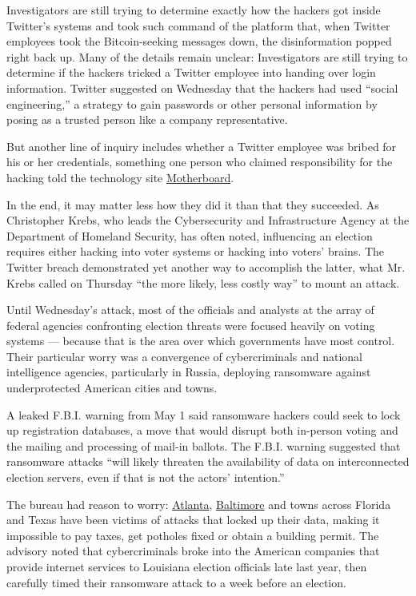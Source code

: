 Investigators are still trying to determine exactly how the hackers got
inside Twitter's systems and took such command of the platform that,
when Twitter employees took the Bitcoin-seeking messages down, the
disinformation popped right back up. Many of the details remain unclear:
Investigators are still trying to determine if the hackers tricked a
Twitter employee into handing over login information. Twitter suggested
on Wednesday that the hackers had used ``social engineering,'' a
strategy to gain passwords or other personal information by posing as a
trusted person like a company representative.

But another line of inquiry includes whether a Twitter employee was
bribed for his or her credentials, something one person who claimed
responsibility for the hacking told the technology site
\href{https://slack-redir.net/link?url=https\%3A\%2F\%2Fwww.vice.com\%2Fen_us\%2Farticle\%2Fjgxd3d\%2Ftwitter-insider-access-panel-account-hacks-biden-uber-bezos}{Motherboard}.

In the end, it may matter less how they did it than that they succeeded.
As Christopher Krebs, who leads the Cybersecurity and Infrastructure
Agency at the Department of Homeland Security, has often noted,
influencing an election requires either hacking into voter systems or
hacking into voters' brains. The Twitter breach demonstrated yet another
way to accomplish the latter, what Mr. Krebs called on Thursday ``the
more likely, less costly way'' to mount an attack.

Until Wednesday's attack, most of the officials and analysts at the
array of federal agencies confronting election threats were focused
heavily on voting systems --- because that is the area over which
governments have most control. Their particular worry was a convergence
of cybercriminals and national intelligence agencies, particularly in
Russia, deploying ransomware against underprotected American cities and
towns.

A leaked F.B.I. warning from May 1 said ransomware hackers could seek to
lock up registration databases, a move that would disrupt both in-person
voting and the mailing and processing of mail-in ballots. The F.B.I.
warning suggested that ransomware attacks ``will likely threaten the
availability of data on interconnected election servers, even if that is
not the actors' intention.''

The bureau had reason to worry:
\href{https://www.nytimes.com/2018/03/27/us/cyberattack-atlanta-ransomware.html}{Atlanta},
\href{https://www.nytimes.com/2019/05/22/us/baltimore-ransomware.html}{Baltimore}
and towns across Florida and Texas have been victims of attacks that
locked up their data, making it impossible to pay taxes, get potholes
fixed or obtain a building permit. The advisory noted that
cybercriminals broke into the American companies that provide internet
services to Louisiana election officials late last year, then carefully
timed their ransomware attack to a week before an election.


